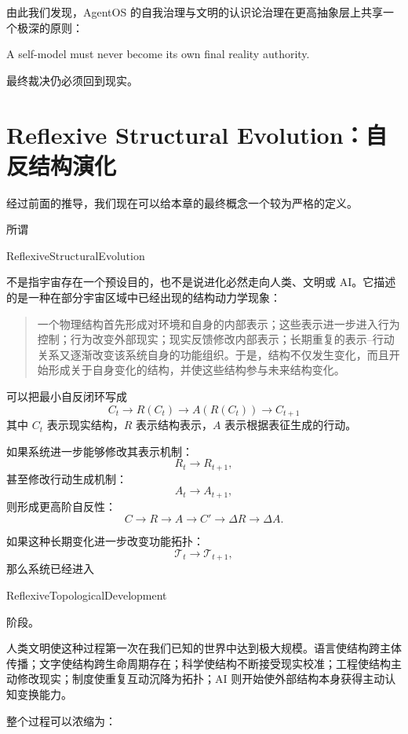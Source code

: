 由此我们发现，AgentOS 的自我治理与文明的认识论治理在更高抽象层上共享一个极深的原则：
\begin{statementbox}
A self-model must never become its own final reality authority.
\end{statementbox}

最终裁决仍必须回到现实。


\section{Reflexive Structural Evolution：自反结构演化}

经过前面的推导，我们现在可以给本章的最终概念一个较为严格的定义。

所谓
\begin{statementbox}
ReflexiveStructuralEvolution
\end{statementbox}
不是指宇宙存在一个预设目的，也不是说进化必然走向人类、文明或 AI。它描述的是一种在部分宇宙区域中已经出现的结构动力学现象：

\begin{quote}
一个物理结构首先形成对环境和自身的内部表示；这些表示进一步进入行为控制；行为改变外部现实；现实反馈修改内部表示；长期重复的表示--行动关系又逐渐改变该系统自身的功能组织。于是，结构不仅发生变化，而且开始形成关于自身变化的结构，并使这些结构参与未来结构变化。
\end{quote}

可以把最小自反闭环写成
\[
\boxed{
C_t
\rightarrow
R(C_t)
\rightarrow
A(R(C_t))
\rightarrow
C_{t+1}
}
\]
其中 $C_t$ 表示现实结构，$R$ 表示结构表示，$A$ 表示根据表征生成的行动。

如果系统进一步能够修改其表示机制：
\[
R_t\rightarrow R_{t+1},
\]
甚至修改行动生成机制：
\[
A_t\rightarrow A_{t+1},
\]
则形成更高阶自反性：
\[
\boxed{
C
\rightarrow
R
\rightarrow
A
\rightarrow
C'
\rightarrow
\Delta R
\rightarrow
\Delta A.
}
\]

如果这种长期变化进一步改变功能拓扑：
\[
\mathcal T_t
\rightarrow
\mathcal T_{t+1},
\]
那么系统已经进入
\begin{statementbox}
ReflexiveTopologicalDevelopment
\end{statementbox}
阶段。

人类文明使这种过程第一次在我们已知的世界中达到极大规模。语言使结构跨主体传播；文字使结构跨生命周期存在；科学使结构不断接受现实校准；工程使结构主动修改现实；制度使重复互动沉降为拓扑；AI 则开始使外部结构本身获得主动认知变换能力。

整个过程可以浓缩为：

\begin{statementbox}
\centering
{}
\end{statementbox}

